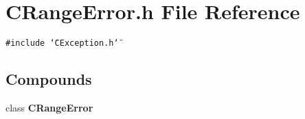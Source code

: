 \section{CRange\-Error.h File Reference}
\label{CRangeError_8h}
{\tt \#include \char`\"{}CException.h\char`\"{}}\par
\subsection*{Compounds}
\begin{CompactItemize}
\item 
class {\bf CRange\-Error}
\end{CompactItemize}
